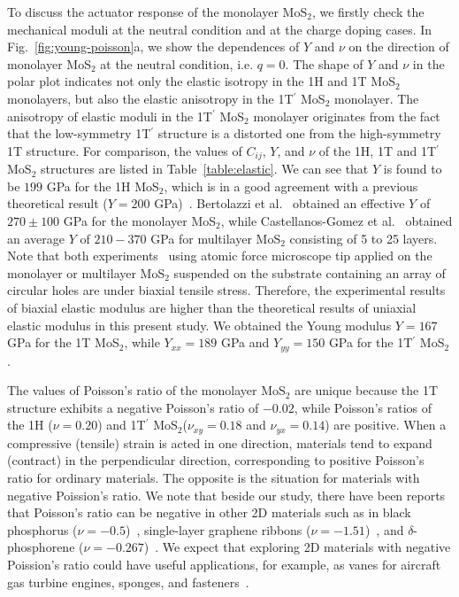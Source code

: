 \documentclass[12pt]{iopart}
\begin{document}
To discuss the actuator response of the monolayer MoS$_2$, we firstly
check the mechanical moduli at the neutral condition and at the charge
doping cases. In Fig.~\ref{fig:young-poisson}a, we show the dependences of $Y$ and $\nu$ on the direction of monolayer MoS$_2$ at the neutral condition,
i.e. $q=0$. The shape of $Y$ and $\nu$ in the polar plot indicates not
only the elastic isotropy in the 1H and 1T MoS$_2$ monolayers, but
also the elastic anisotropy in the 1T$^\prime$ MoS$_2$ monolayer.  The
anisotropy of elastic moduli in the 1T$^\prime$ MoS$_2$ monolayer
originates from the fact that the low-symmetry 1T$^\prime$ structure
is a distorted one from the high-symmetry 1T structure.  For
comparison, the values of $C_{ij}$, $Y$, and $\nu$ of the 1H, 1T and
1T$^\prime$ MoS$_2$ structures are listed in
Table~\ref{table:elastic}.  We can see that $Y$ is found to be $199$
GPa for the 1H MoS$_2$, which is in a good agreement with a previous
theoretical result ($Y=200$ GPa)~\cite{li2012ideal}.  Bertolazzi et
al.~\cite{bertolazzi2011stretching} obtained an effective $Y$ of
$270\pm100$ GPa for the monolayer MoS$_2$, while Castellanos-Gomez et
al.~\cite{castellanos2012elastic} obtained an average $Y$ of $210-370$
GPa for multilayer MoS$_2$ consisting of 5 to 25 layers.  Note that
both
experiments~\cite{bertolazzi2011stretching,castellanos2012elastic}
using atomic force microscope tip applied on the monolayer or
multilayer MoS$_2$ suspended on the substrate containing an array of
circular holes are under biaxial tensile stress.  Therefore, the
experimental results of biaxial elastic modulus are higher than the
theoretical results of uniaxial elastic modulus in this present study.
We obtained the Young modulus $Y=167$ GPa for the 1T MoS$_2$, while
$Y_{xx}=189$ GPa and $Y_{yy}=150$ GPa for the 1T$^\prime$ MoS$_2$.

The values of Poisson's ratio of the monolayer MoS$_2$ are unique
because the 1T structure exhibits a negative Poisson's ratio of
$-0.02$, while Poisson's ratios of the 1H ($\nu=0.20$) and 1T$^\prime$
MoS$_2$($\nu_{xy}=0.18$ and $\nu_{yx}=0.14$) are positive.  When a
compressive (tensile) strain is acted in one direction, materials tend
to expand (contract) in the perpendicular direction, corresponding to
positive Poisson's ratio for ordinary materials.  The opposite is the
situation for materials with negative Poission's ratio.  We note that
beside our study, there have been reports that Poisson's ratio can be
negative in other 2D materials such as in black phosphorus
($\nu=-0.5$)~\cite{du2016auxetic}, single-layer graphene ribbons
($\nu=-1.51$)~\cite{jiang2016negative}, and $\delta$-phosphorene
($\nu=-0.267$)~\cite{wang2017delta}.  We expect that exploring 2D
materials with negative Poission's ratio could have useful
applications, for example, as vanes for aircraft gas turbine engines,
sponges, and fasteners~\cite{baughman1998negative}.
\end{document}
